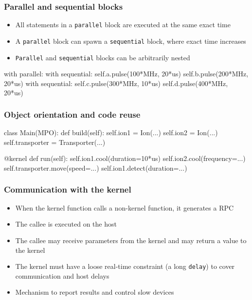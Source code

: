 \documentclass{beamer}
\begin{document}
\begin{frame}[fragile]
\frametitle{\selectfont Parallel and sequential blocks}
\begin{itemize}
\item All statements in a \verb!parallel! block are executed at the same exact time
\item A \verb!parallel! block can spawn a \verb!sequential! block, where exact time increases
\item \verb!Parallel! and \verb!sequential! blocks can be arbitrarily nested
\end{itemize}
\begin{verbatimtab}
with parallel:
    with sequential:
        self.a.pulse(100*MHz, 20*us)
        self.b.pulse(200*MHz, 20*us)
    with sequential:
        self.c.pulse(300*MHz, 10*us)
        self.d.pulse(400*MHz, 20*us)
\end{verbatimtab}
\end{frame}

\begin{frame}[fragile]
\frametitle{\selectfont Object orientation and code reuse}
\begin{verbatimtab}
class Main(MPO):
    def build(self):
        self.ion1 = Ion(...)
        self.ion2 = Ion(...)
        self.transporter = Transporter(...)

    @kernel
    def run(self):
        self.ion1.cool(duration=10*us)
        self.ion2.cool(frequency=...)
        self.transporter.move(speed=...)
        self.ion1.detect(duration=...)
\end{verbatimtab}
\end{frame}

\begin{frame}[fragile]
\frametitle{\selectfont Communication with the kernel}
\begin{itemize}
\item When the kernel function calls a non-kernel function, it generates a RPC
\item The callee is executed on the host
\item The callee may receive parameters from the kernel and may return a value to the kernel
\item The kernel must have a loose real-time constraint (a long \verb!delay!) to cover communication and host delays
\item Mechanism to report results and control slow devices
\end{itemize}
\end{frame}
\end{document}
